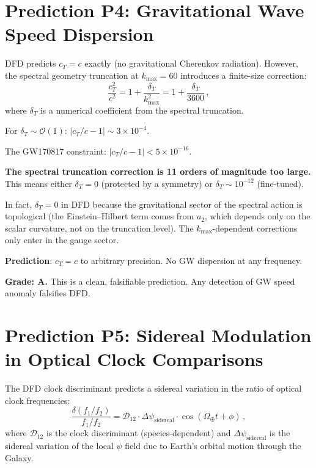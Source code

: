 \documentclass[11pt,a4paper]{article}
\begin{document}
\section{Prediction P4: Gravitational Wave Speed Dispersion}

DFD predicts $c_T = c$ exactly (no gravitational Cherenkov radiation). However, the spectral geometry truncation at $k_{\max} = 60$ introduces a finite-size correction:
\begin{equation}
\frac{c_T^2}{c^2} = 1 + \frac{\delta_T}{k_{\max}^2} = 1 + \frac{\delta_T}{3600}\,,
\end{equation}
where $\delta_T$ is a numerical coefficient from the spectral truncation.

For $\delta_T \sim \mathcal{O}(1)$: $|c_T/c - 1| \sim 3 \times 10^{-4}$.

The GW170817 constraint: $|c_T/c - 1| < 5 \times 10^{-16}$.

\textbf{The spectral truncation correction is 11 orders of magnitude too large.} This means either $\delta_T = 0$ (protected by a symmetry) or $\delta_T \sim 10^{-12}$ (fine-tuned).

In fact, $\delta_T = 0$ in DFD because the gravitational sector of the spectral action is topological (the Einstein--Hilbert term comes from $a_2$, which depends only on the scalar curvature, not on the truncation level). The $k_{\max}$-dependent corrections only enter in the gauge sector.

\textbf{Prediction}: $c_T = c$ to arbitrary precision. No GW dispersion at any frequency.

\textbf{Grade: A.} This is a clean, falsifiable prediction. Any detection of GW speed anomaly falsifies DFD.

\section{Prediction P5: Sidereal Modulation in Optical Clock Comparisons}

The DFD clock discriminant predicts a sidereal variation in the ratio of optical clock frequencies:
\begin{equation}
\frac{\delta(f_1/f_2)}{f_1/f_2} = \mathcal{D}_{12} \cdot \Delta\psi_{\mathrm{sidereal}} \cdot \cos(\Omega_{\oplus} t + \phi)\,,
\end{equation}
where $\mathcal{D}_{12}$ is the clock discriminant (species-dependent) and $\Delta\psi_{\mathrm{sidereal}}$ is the sidereal variation of the local $\psi$ field due to Earth's orbital motion through the Galaxy.
\end{document}
